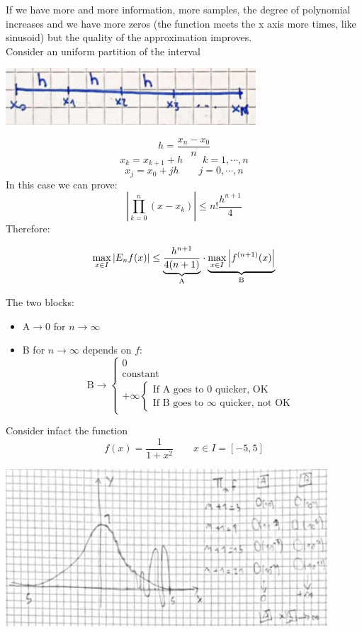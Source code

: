     If we have more and more information, more samples, the degree of polynomial increases and we have more zeros (the function meets the x axis more times, like sinusoid) but the quality of the approximation improves.\\
    Consider an uniform partition of the interval
    \begin{center}
        \includegraphics[width=0.7\textwidth]{images/uniform_dist.png}
    \end{center}
    $$
    h=\frac{x_n-x_0}{n}
    $$
    $$
    x_k=x_{k+1}+h\qquad k=1,\cdots,n
    $$
    $$
    x_j=x_0+jh\qquad j=0,\cdots,n
    $$
    In this case we can prove:
    $$
    \left|
        \prod_{k=0}^n(x-x_k)
    \right|\leq
    n!\frac{h^{n+1}}{4}
    $$
    Therefore:
    \begin{LARGE} 
    $$
    \max_{x\in I}\left|E_nf(x)\right|
    \leq
    \underlabel{
        \frac{
            h^{n+1}
        }{
            4(n+1)
        }
    }{A}
    \cdot
    \underlabel{
        \max_{x\in I}\left|
            f^{(n+1)}(x)
        \right|
    }{B}
    $$
    \end{LARGE}
    The two blocks:
    \begin{itemize}
        \item A$\rightarrow$0 for $n\rightarrow\infty$
        \item B for $n\rightarrow\infty$ depends on $f$:
        $$
        \text{B}\rightarrow
        \begin{cases}
            0\\
            \text{constant}\\
            +\infty\begin{cases}
                \text{If A goes to 0 quicker, OK}\\
                \text{If B goes to $\infty$ quicker, not OK}
            \end{cases}
        \end{cases}
        $$
    \end{itemize}
    Consider infact the function
    $$
    f(x)=\frac{1}{1+x^2}\qquad x\in I =\left[-5,5\right]
    $$
    \begin{center}
        \includegraphics[width=0.9\textwidth]{images/runge.png}
    \end{center}
